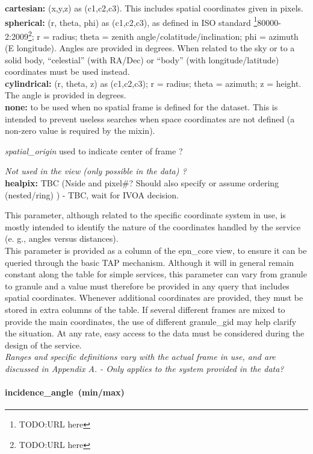 \documentclass[11pt,a4paper]{ivoa}
\begin{document}
\textbf{cartesian:} (x,y,z) as (c1,c2,c3). This includes spatial coordinates given in pixels.\\ \textbf{spherical:} (r, theta, phi) as (c1,c2,c3), as defined in ISO standard \footnote{TODO:URL here}80000-2:2009\footnote{TODO:URL here}; r = radius; theta = zenith angle/colatitude/inclination; phi = azimuth (E longitude). Angles are provided in degrees. When related to the sky or to a solid body, ``celestial'' (with RA/Dec) or ``body'' (with longitude/latitude) coordinates must be used instead. \\\textbf{cylindrical:} (r, theta, z) as (c1,c2,c3); r = radius; theta = azimuth; z = height. The angle is provided in degrees.\\\textbf{none:} to be used when no spatial frame is defined for the dataset. This is intended to prevent useless searches when space coordinates are not defined (a non-zero value is required by the mixin).

\emph{spatial\_origin} used to indicate center of frame ?

\emph{Not used in the view (only possible in the data) ?}\\ \textbf{healpix:} TBC (Nside and pixel\#? Should also specify or assume ordering (nested/ring) ) - TBC, wait for IVOA decision.

This parameter, although related to the specific coordinate system in use, is mostly intended to identify the nature of the coordinates handled by the service (e. g., angles versus distances).\\ This parameter is provided as a column of the epn\_core view, to ensure it can be queried through the basic TAP mechanism. Although it will in general remain constant along the table for simple services, this parameter can vary from granule to granule and a value must therefore be provided in any query that includes spatial coordinates. Whenever additional coordinates are provided, they must be stored in extra columns of the table. If several different frames are mixed to provide the main coordinates, the use of different granule\_gid may help clarify the situation. At any rate, easy access to the data must be considered during the design of the service. \\\emph{ Ranges and specific definitions vary with the actual frame in use, and are discussed in Appendix A. - Only applies to the system provided in the data?} 

\paragraph{incidence\_angle (min/max)}
\end{document}
